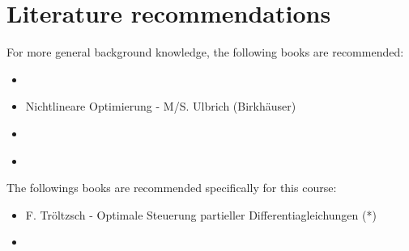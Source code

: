 \documentclass[../skript.tex]{subfiles}
\begin{document}
\section*{Literature recommendations}
For more general background knowledge, the following books are recommended:
\begin{itemize}
\item \cite{AltNO} %
\item Nichtlineare Optimierung - M/S. Ulbrich (Birkhäuser)
\item \cite{Evans} %
\item \cite{Ciarlet} %
\end{itemize}
The followings books are recommended specifically for this course:
\begin{itemize}
\item F. Tröltzsch - Optimale Steuerung partieller Differentiagleichungen (*)
\item \cite{HinzePinnauUlbrich} %
\end{itemize}
\end{document}
